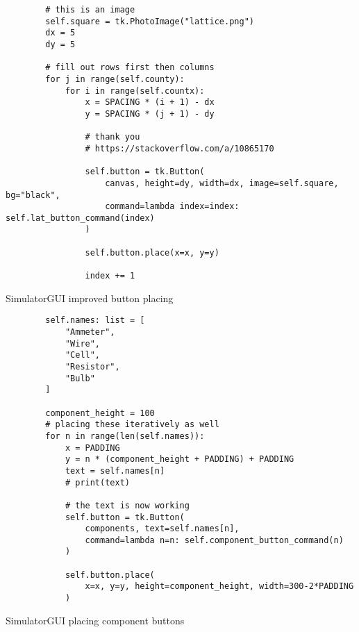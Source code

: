 \newpage
\begin{listing}[!ht]
    \begin{verbatim}
        # this is an image
        self.square = tk.PhotoImage("lattice.png")
        dx = 5
        dy = 5
        
        # fill out rows first then columns
        for j in range(self.county):
            for i in range(self.countx):
                x = SPACING * (i + 1) - dx
                y = SPACING * (j + 1) - dy
                
                # thank you 
                # https://stackoverflow.com/a/10865170
                
                self.button = tk.Button(
                    canvas, height=dy, width=dx, image=self.square, bg="black",
                    command=lambda index=index: self.lat_button_command(index)
                )
                
                self.button.place(x=x, y=y)
                
                index += 1
    \end{verbatim}
    \caption{SimulatorGUI improved button placing}
    \label{sc:simgui-improved-button-placing}
\end{listing}

\newpage
\begin{listing}[!ht]
    \begin{verbatim}
        self.names: list = [
            "Ammeter",
            "Wire",
            "Cell",
            "Resistor",
            "Bulb"
        ]
        
        component_height = 100
        # placing these iteratively as well
        for n in range(len(self.names)):
            x = PADDING
            y = n * (component_height + PADDING) + PADDING
            text = self.names[n]
            # print(text)
            
            # the text is now working
            self.button = tk.Button(
                components, text=self.names[n],
                command=lambda n=n: self.component_button_command(n)
            )
            
            self.button.place(
                x=x, y=y, height=component_height, width=300-2*PADDING
            )    
    \end{verbatim}
    \caption{SimulatorGUI placing component buttons}
    \label{sc:simgui-component-buttons}
\end{listing}

